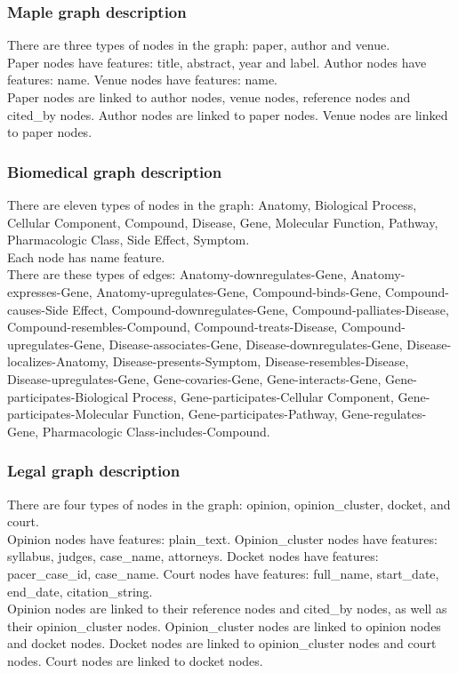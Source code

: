 \subsubsection{Maple graph description}
There are three types of nodes in the graph: paper, author and venue.\\
Paper nodes have features: title, abstract, year and label. Author nodes have features: name. Venue nodes have features: name.\\
Paper nodes are linked to author nodes, venue nodes, reference nodes and cited\_by nodes. Author nodes are linked to paper nodes. Venue nodes are linked to paper nodes.

\subsubsection{Biomedical graph description}
There are eleven types of nodes in the graph: Anatomy, Biological Process, Cellular Component, Compound, Disease, Gene, Molecular Function, Pathway, Pharmacologic Class, Side Effect, Symptom.\\
Each node has name feature.\\
There are these types of edges: Anatomy-downregulates-Gene, Anatomy-expresses-Gene, Anatomy-upregulates-Gene, Compound-binds-Gene, Compound-causes-Side Effect, Compound-downregulates-Gene, Compound-palliates-Disease, Compound-resembles-Compound, Compound-treats-Disease, Compound-upregulates-Gene, Disease-associates-Gene, Disease-downregulates-Gene, Disease-localizes-Anatomy, Disease-presents-Symptom, Disease-resembles-Disease, Disease-upregulates-Gene, Gene-covaries-Gene, Gene-interacts-Gene, Gene-participates-Biological Process, Gene-participates-Cellular Component, Gene-participates-Molecular Function, Gene-participates-Pathway, Gene-regulates-Gene, Pharmacologic Class-includes-Compound.

\subsubsection{Legal graph description}
There are four types of nodes in the graph: opinion, opinion\_cluster, docket, and court.\\
Opinion nodes have features: plain\_text. Opinion\_cluster nodes have features: syllabus, judges, case\_name, attorneys. Docket nodes have features: pacer\_case\_id, case\_name. Court nodes have features: full\_name, start\_date, end\_date, citation\_string.\\
Opinion nodes are linked to their reference nodes and cited\_by nodes, as well as their opinion\_cluster nodes. Opinion\_cluster nodes are linked to opinion nodes and docket nodes. Docket nodes are linked to opinion\_cluster nodes and court nodes. Court nodes are linked to docket nodes.

